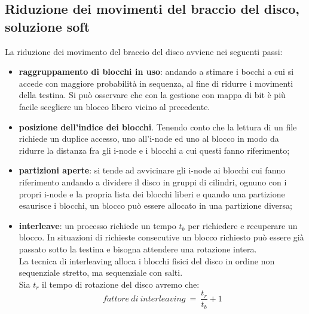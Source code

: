 \documentclass[12pt, letterpaper]{report}
\begin{document}
	\subsection{Riduzione dei movimenti del braccio del disco, soluzione soft} La riduzione dei movimento del braccio del disco avviene nei seguenti passi:
	\begin{itemize}
		\item \textbf{raggruppamento di blocchi in uso}: andando a stimare i bocchi a cui si accede con maggiore probabilità in sequenza, al fine di ridurre i movimenti della testina. Si può osservare che con la gestione con mappa di bit è più facile scegliere un blocco libero vicino al precedente.
		\item \textbf{posizione dell'indice dei blocchi}. Tenendo conto che la lettura di un file richiede un duplice accesso, uno all'i-node ed uno al blocco in modo da ridurre la distanza fra gli i-node e i blocchi a cui questi fanno riferimento;
		\item \textbf{partizioni aperte}: si tende ad avvicinare gli i-node ai blocchi cui fanno riferimento andando a dividere il disco in gruppi di cilindri, ognuno con i propri i-node e la propria lista dei blocchi liberi e quando una partizione esaurisce i blocchi, un blocco può essere allocato in una partizione diversa;
		\item \textbf{interleave}: un processo richiede un tempo $t_b$ per richiedere e recuperare un blocco. In situazioni di richieste consecutive un blocco richiesto può essere già passato sotto la testina e bisogna attendere una rotazione intera. \\
		La tecnica di interleaving alloca i blocchi fisici del disco in ordine non sequenziale stretto, ma sequenziale con salti. \\
		Sia $t_r$ il tempo di rotazione del disco avremo che:
		\[fattore\ di\ interleaving\ =\ \dfrac{t_r}{t_b} + 1\]
	\end{itemize}
\end{document}
